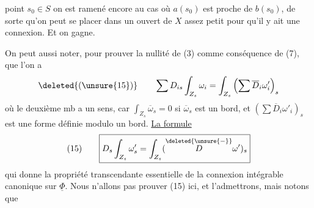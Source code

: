 point $s_0\in S$ on est ramené encore au cas où $a(s_0)$ est proche de $b(s_0)$, de sorte qu'on peut  se placer dans un ouvert de $X$ assez petit pour qu'il y ait une connexion. Et on gagne.

On peut aussi noter,  pour prouver la  nullité de (3) comme conséquence de (7), que l'on a
\[
\deleted{(\unsure{15})}\qquad \sum D_{is}\int_{Z_s}\omega_i=\int_{Z_s}\left(\sum\overline D_i\omega'_i\right)_s
\]
où le deuxième mb a un sens, car $\int_{Z_s}\overline\omega_s=0$ si $\overline\omega_s$ est un bord, et $\left(\sum\overline D_i\omega'_i\right)_s$ est une forme définie modulo un bord. \uline{La formule }  
\[
(15)\qquad\boxed{D_s\int_{Z_s}\omega'_s=\int_{Z_s}(\overset{\deleted{\unsure{-}}}{D}\omega')_s}
\]
qui donne la propriété transcendante essentielle de la connexion intégrable canonique sur $\underline\Phi$. Nous n'allons pas prouver (15) ici, et l'admettrons, mais notons que

